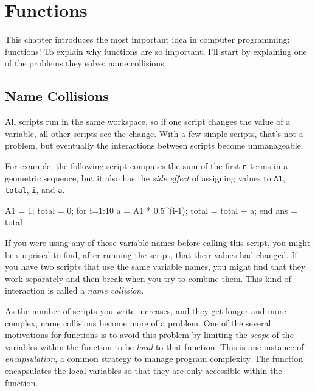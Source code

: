 \documentclass[../../book.tex]{subfiles}
\begin{document}
\chapter{Functions}
\label{functions}


This chapter introduces the most important idea in computer programming: \mbox{functions}!
To explain why functions are so important, I'll start by explaining one of the problems they solve: name collisions.


\section{Name Collisions}
\label{collision}


All scripts run in the same workspace, so if one script changes the value of a variable, all other scripts see the change.  With a few simple scripts, that's not a problem, but eventually the interactions between scripts become unmanageable.

For example, the following script computes the
sum of the first \lstinline{n} terms in a geometric sequence, but it also
has the {\em side effect} of assigning values to \lstinline{A1}, \lstinline{total},
\lstinline{i}, and \lstinline{a}.

\begin{code}
A1 = 1;
total = 0;
for i=1:10
    a = A1 * 0.5^(i-1);
    total = total + a;
end
ans = total
\end{code}

If you were using any of those variable names before calling this
script, you might be surprised to find, after running the script,
that their values had changed.  If you have two scripts that use
the same variable names, you might find that they work separately
and then break when you try to combine them.  This kind of
interaction is called a \emph{name collision}.


As the number of scripts you write increases, and they get longer
and more complex, name collisions become more of a problem.  One of the several motivations for functions is to avoid this problem by limiting the \emph{scope} of the variables within the function to be \emph{local} to that function.  This is one instance of \emph{encapsulation}, a common strategy to manage program complexity.  The function encapsulates the local variables so that they are only accessible within the function.
\end{document}
